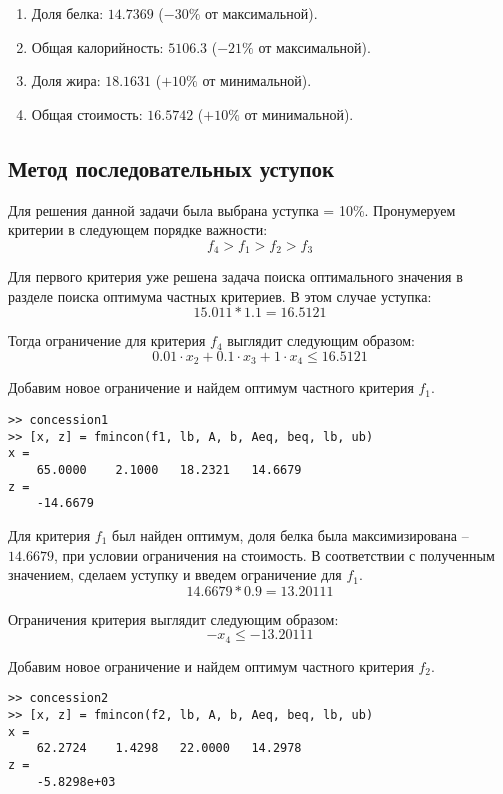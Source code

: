 \begin{enumerate}
	\item Доля белка: $14.7369$ ($-30\%$ от максимальной).
	\item Общая калорийность: $5106.3$ ($-21\%$ от максимальной).
	\item Доля жира: $18.1631$ ($+10\%$ от минимальной).
	\item Общая стоимость: $16.5742$ ($+10\%$ от минимальной).
\end{enumerate}

\subsection{Метод последовательных уступок}

Для решения данной задачи была выбрана уступка = 10\%. Пронумеруем критерии в следующем порядке важности:
$$
f_4 > f_1 > f_2 > f_3
$$

Для первого критерия уже решена задача поиска оптимального значения в разделе поиска оптимума частных критериев. В этом случае уступка:
$$
15.011 * 1.1 = 16.5121
$$

Тогда ограничение для критерия $f_4$ выглядит следующим образом:
$$
0.01 \cdot x_2 + 0.1 \cdot x_3 + 1 \cdot x_4 \leq 16.5121
$$

Добавим новое ограничение и найдем оптимум частного критерия $f_1$.



\begin{lstlisting}[caption=\code{Console}]
>> concession1
>> [x, z] = fmincon(f1, lb, A, b, Aeq, beq, lb, ub)
x =
	65.0000    2.1000   18.2321   14.6679
z =
	-14.6679
\end{lstlisting}

Для критерия $f_1$ был найден оптимум, доля белка была максимизирована -- $14.6679$, при условии ограничения на стоимость. В соответствии с полученным значением, сделаем уступку и введем ограничение для $f_1$.
$$
14.6679 * 0.9 = 13.20111
$$

Ограничения критерия выглядит следующим образом:
$$
-x_4 \leq -13.20111
$$

Добавим новое ограничение и найдем оптимум частного критерия $f_2$.



\begin{lstlisting}[caption=\code{Console}]
>> concession2
>> [x, z] = fmincon(f2, lb, A, b, Aeq, beq, lb, ub)
x =
	62.2724    1.4298   22.0000   14.2978
z =
	-5.8298e+03
\end{lstlisting}

